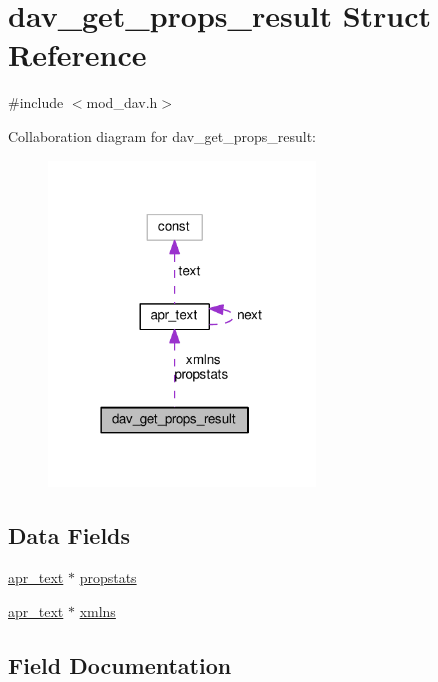 \hypertarget{structdav__get__props__result}{}\section{dav\+\_\+get\+\_\+props\+\_\+result Struct Reference}
\label{structdav__get__props__result}


{\ttfamily \#include $<$mod\+\_\+dav.\+h$>$}



Collaboration diagram for dav\+\_\+get\+\_\+props\+\_\+result\+:
\nopagebreak
\begin{figure}[H]
\begin{center}
\leavevmode
\includegraphics[width=201pt]{structdav__get__props__result__coll__graph}
\end{center}
\end{figure}
\subsection*{Data Fields}
\begin{DoxyCompactItemize}
\item 
\hyperlink{structapr__text}{apr\+\_\+text} $\ast$ \hyperlink{structdav__get__props__result_a4b85233991b37cb03b36ef1bbf2a277f}{propstats}
\item 
\hyperlink{structapr__text}{apr\+\_\+text} $\ast$ \hyperlink{structdav__get__props__result_a1f3c2a589a3a3d3169b8f6cf473fabc8}{xmlns}
\end{DoxyCompactItemize}


\subsection{Field Documentation}
